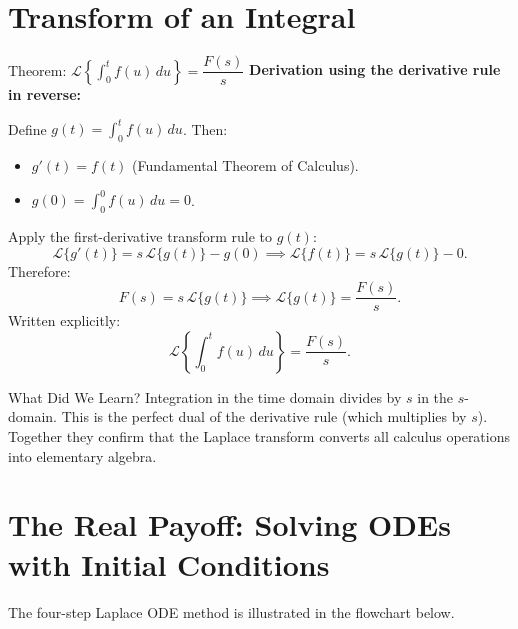 \documentclass[12pt,a4paper]{article}
\begin{document}
\section{Transform of an Integral}

\begin{infobox}{Theorem: \(\mathcal{L}\left\{\int_0^t f(u)\,du\right\} = \dfrac{F(s)}{s}\)}
\textbf{Derivation using the derivative rule in reverse:}

Define \(g(t) = \int_0^t f(u)\,du\).
Then:
\begin{itemize}
  \item \(g'(t) = f(t)\) \quad (Fundamental Theorem of Calculus).
  \item \(g(0) = \int_0^0 f(u)\,du = 0\).
\end{itemize}
Apply the first-derivative transform rule to \(g(t)\):
\[
  \mathcal{L}\{g'(t)\} = s\,\mathcal{L}\{g(t)\} - g(0)
  \implies
  \mathcal{L}\{f(t)\} = s\,\mathcal{L}\{g(t)\} - 0.
\]
Therefore:
\[
  F(s) = s\,\mathcal{L}\{g(t)\}
  \implies
  \mathcal{L}\{g(t)\} = \frac{F(s)}{s}.
\]
Written explicitly:
\[
  \boxed{\mathcal{L}\!\left\{\int_0^t f(u)\,du\right\} = \frac{F(s)}{s}.}
\]
\end{infobox}

\begin{learnbox}{What Did We Learn?}
Integration in the time domain divides by \(s\) in the \(s\)-domain.
This is the perfect dual of the derivative rule (which multiplies by \(s\)).
Together they confirm that the Laplace transform converts all calculus operations into
elementary algebra.
\end{learnbox}

\section{The Real Payoff: Solving ODEs with Initial Conditions}

The four-step Laplace ODE method is illustrated in the flowchart below.
\end{document}
